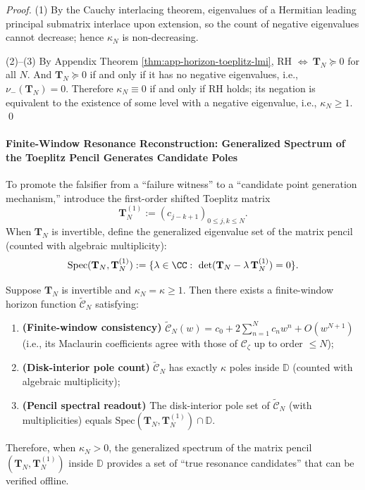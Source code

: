 \begin{proof}
(1) By the Cauchy interlacing theorem, eigenvalues of a Hermitian leading principal submatrix interlace upon extension, so the count of negative eigenvalues cannot decrease; hence \(\kappa_N\) is non-decreasing.
\par
(2)--(3) By Appendix Theorem \ref{thm:app-horizon-toeplitz-lmi}, RH \(\Longleftrightarrow\ \mathbf{T}_N\succeq 0\) for all \(N\).
And \(\mathbf{T}_N\succeq 0\) if and only if it has no negative eigenvalues, i.e., \(\nu_-(\mathbf{T}_N)=0\).
Therefore \(\kappa_N\equiv 0\) if and only if RH holds; its negation is equivalent to the existence of some level with a negative eigenvalue, i.e., \(\kappa_N\ge 1\). \qed
\end{proof}

\paragraph{Finite-Window Resonance Reconstruction: Generalized Spectrum of the Toeplitz Pencil Generates Candidate Poles}
To promote the falsifier from a ``failure witness'' to a ``candidate point generation mechanism,'' introduce the first-order shifted Toeplitz matrix
\[
\mathbf{T}_N^{(1)}:=(c_{j-k+1})_{0\le j,k\le N}.
\]
When \(\mathbf{T}_N\) is invertible, define the generalized eigenvalue set of the matrix pencil (counted with algebraic multiplicity):
\[
\mathrm{Spec}(\mathbf{T}_N,\mathbf{T}_N^{(1)})
:=\{\lambda\in\CC:\ \det(\mathbf{T}_N-\lambda\,\mathbf{T}_N^{(1)})=0\}.
\]

\begin{theorem}\label{thm:xi-resonance-pencil-reconstruction}
Suppose \(\mathbf{T}_N\) is invertible and \(\kappa_N=\kappa\ge 1\).
Then there exists a finite-window horizon function \(\widetilde{\mathscr{C}}_{N}\) satisfying:
\begin{enumerate}
  \item \textbf{(Finite-window consistency)} \(\widetilde{\mathscr{C}}_{N}(w)=c_0+2\sum_{n=1}^{N}c_n w^n+O(w^{N+1})\) (i.e., its Maclaurin coefficients agree with those of \(\mathscr{C}_{\zeta}\) up to order \(\le N\));
  \item \textbf{(Disk-interior pole count)} \(\widetilde{\mathscr{C}}_{N}\) has exactly \(\kappa\) poles inside \(\mathbb{D}\) (counted with algebraic multiplicity);
  \item \textbf{(Pencil spectral readout)} The disk-interior pole set of \(\widetilde{\mathscr{C}}_{N}\) (with multiplicities) equals
  \(\mathrm{Spec}(\mathbf{T}_N,\mathbf{T}_N^{(1)})\cap\mathbb{D}\).
\end{enumerate}
Therefore, when \(\kappa_N>0\), the generalized spectrum of the matrix pencil \((\mathbf{T}_N,\mathbf{T}_N^{(1)})\) inside \(\mathbb{D}\) provides a set of ``true resonance candidates'' that can be verified offline.
\end{theorem}

